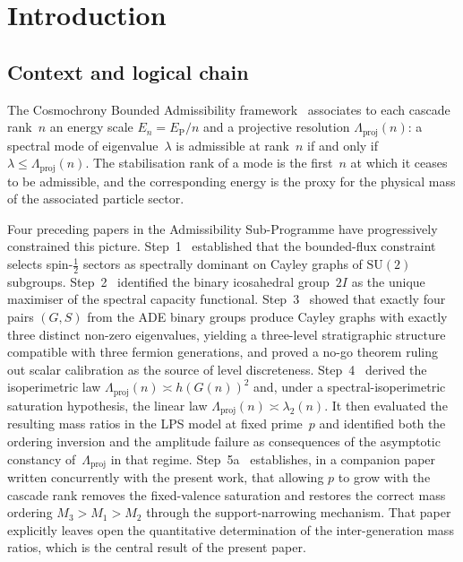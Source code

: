 \documentclass[11pt,a4paper]{article}
\newcommand{\Lproj}{\Lambda_{\mathrm{proj}}}
\newcommand{\ltwo}{\lambda_{2}}
\newcommand{\EP}{E_{\mathrm{P}}}
\begin{document}
  \clearpage
  \tableofcontents

  \section{Introduction}
    \label{sec:intro}

    \subsection{Context and logical chain}
      \label{subsec:context}

      The Cosmochrony Bounded Admissibility framework~\cite{Cosmochrony}
      associates to each cascade rank~$n$ an energy scale $E_n = \EP/n$
      and a projective resolution $\Lproj(n)$: a spectral mode of eigenvalue~$\lambda$
      is admissible at rank~$n$ if and only if $\lambda \leq \Lproj(n)$.
      The stabilisation rank of a mode is the first~$n$ at which it ceases to be admissible,
      and the corresponding energy is the proxy for the physical mass of the associated
      particle sector.

      Four preceding papers in the Admissibility Sub-Programme have progressively
      constrained this picture.
      Step~1~\cite{Beau2026a1} established that the bounded-flux constraint
      selects spin-$\tfrac{1}{2}$ sectors as spectrally dominant on Cayley graphs of
      $\mathrm{SU}(2)$ subgroups.
      Step~2~\cite{Beau2026a2} identified the binary icosahedral group~$2I$ as the
      unique maximiser of the spectral capacity functional.
      Step~3~\cite{Beau2026a4} showed that exactly four pairs $(G,S)$ from the
      ADE binary groups produce Cayley graphs with exactly three distinct non-zero eigenvalues,
      yielding a three-level stratigraphic structure compatible with three fermion generations,
      and proved a no-go theorem ruling out scalar calibration as the source of level
      discreteness.
      Step~4~\cite{Beau2026a5} derived the isoperimetric law
      $\Lproj(n)\asymp h(G(n))^{2}$ and, under a spectral-isoperimetric saturation
      hypothesis, the linear law $\Lproj(n)\asymp\ltwo(n)$.
      It then evaluated the resulting mass ratios in the LPS model at fixed prime~$p$
      and identified both the ordering inversion and the amplitude failure as consequences
      of the asymptotic constancy of~$\Lproj$ in that regime.
      Step~5a~\cite{Beau2026a6} establishes, in a companion paper written concurrently
      with the present work, that allowing $p$ to grow with the cascade rank removes
      the fixed-valence saturation and restores the correct mass ordering
      $M_3 > M_1 > M_2$ through the support-narrowing mechanism.
      That paper explicitly leaves open the quantitative determination of the
      inter-generation mass ratios, which is the central result of the present paper.
\end{document}
